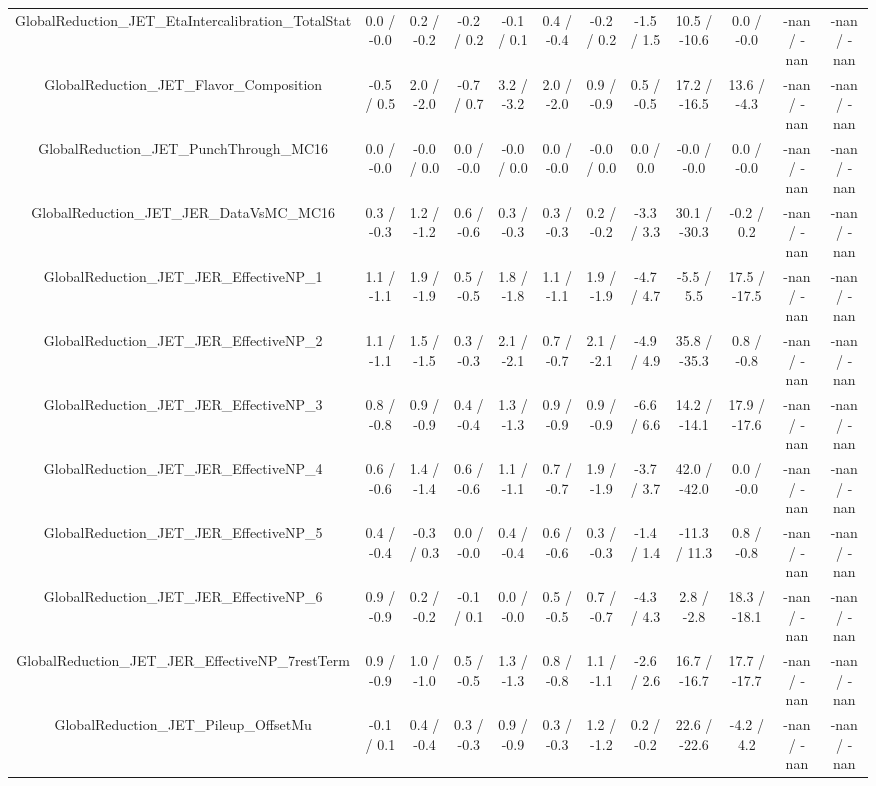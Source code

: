 \begin{table}[htbp]
\begin{center}
\begin{tabular}{|c|c|c|c|c|c|c|c|c|c|c|c|}
  GlobalReduction_JET_EtaIntercalibration_TotalStat & 0.0 / -0.0 & 0.2 / -0.2 & -0.2 / 0.2 & -0.1 / 0.1 & 0.4 / -0.4 & -0.2 / 0.2 & -1.5 / 1.5 & 10.5 / -10.6 & 0.0 / -0.0 & -nan / -nan & -nan / -nan \\ 
  GlobalReduction_JET_Flavor_Composition & -0.5 / 0.5 & 2.0 / -2.0 & -0.7 / 0.7 & 3.2 / -3.2 & 2.0 / -2.0 & 0.9 / -0.9 & 0.5 / -0.5 & 17.2 / -16.5 & 13.6 / -4.3 & -nan / -nan & -nan / -nan \\ 
  GlobalReduction_JET_PunchThrough_MC16 & 0.0 / -0.0 & -0.0 / 0.0 & 0.0 / -0.0 & -0.0 / 0.0 & 0.0 / -0.0 & -0.0 / 0.0 & 0.0 / 0.0 & -0.0 / -0.0 & 0.0 / -0.0 & -nan / -nan & -nan / -nan \\ 
  GlobalReduction_JET_JER_DataVsMC_MC16 & 0.3 / -0.3 & 1.2 / -1.2 & 0.6 / -0.6 & 0.3 / -0.3 & 0.3 / -0.3 & 0.2 / -0.2 & -3.3 / 3.3 & 30.1 / -30.3 & -0.2 / 0.2 & -nan / -nan & -nan / -nan \\ 
  GlobalReduction_JET_JER_EffectiveNP_1 & 1.1 / -1.1 & 1.9 / -1.9 & 0.5 / -0.5 & 1.8 / -1.8 & 1.1 / -1.1 & 1.9 / -1.9 & -4.7 / 4.7 & -5.5 / 5.5 & 17.5 / -17.5 & -nan / -nan & -nan / -nan \\ 
  GlobalReduction_JET_JER_EffectiveNP_2 & 1.1 / -1.1 & 1.5 / -1.5 & 0.3 / -0.3 & 2.1 / -2.1 & 0.7 / -0.7 & 2.1 / -2.1 & -4.9 / 4.9 & 35.8 / -35.3 & 0.8 / -0.8 & -nan / -nan & -nan / -nan \\ 
  GlobalReduction_JET_JER_EffectiveNP_3 & 0.8 / -0.8 & 0.9 / -0.9 & 0.4 / -0.4 & 1.3 / -1.3 & 0.9 / -0.9 & 0.9 / -0.9 & -6.6 / 6.6 & 14.2 / -14.1 & 17.9 / -17.6 & -nan / -nan & -nan / -nan \\ 
  GlobalReduction_JET_JER_EffectiveNP_4 & 0.6 / -0.6 & 1.4 / -1.4 & 0.6 / -0.6 & 1.1 / -1.1 & 0.7 / -0.7 & 1.9 / -1.9 & -3.7 / 3.7 & 42.0 / -42.0 & 0.0 / -0.0 & -nan / -nan & -nan / -nan \\ 
  GlobalReduction_JET_JER_EffectiveNP_5 & 0.4 / -0.4 & -0.3 / 0.3 & 0.0 / -0.0 & 0.4 / -0.4 & 0.6 / -0.6 & 0.3 / -0.3 & -1.4 / 1.4 & -11.3 / 11.3 & 0.8 / -0.8 & -nan / -nan & -nan / -nan \\ 
  GlobalReduction_JET_JER_EffectiveNP_6 & 0.9 / -0.9 & 0.2 / -0.2 & -0.1 / 0.1 & 0.0 / -0.0 & 0.5 / -0.5 & 0.7 / -0.7 & -4.3 / 4.3 & 2.8 / -2.8 & 18.3 / -18.1 & -nan / -nan & -nan / -nan \\ 
  GlobalReduction_JET_JER_EffectiveNP_7restTerm & 0.9 / -0.9 & 1.0 / -1.0 & 0.5 / -0.5 & 1.3 / -1.3 & 0.8 / -0.8 & 1.1 / -1.1 & -2.6 / 2.6 & 16.7 / -16.7 & 17.7 / -17.7 & -nan / -nan & -nan / -nan \\ 
  GlobalReduction_JET_Pileup_OffsetMu & -0.1 / 0.1 & 0.4 / -0.4 & 0.3 / -0.3 & 0.9 / -0.9 & 0.3 / -0.3 & 1.2 / -1.2 & 0.2 / -0.2 & 22.6 / -22.6 & -4.2 / 4.2 & -nan / -nan & -nan / -nan \\ 

\end{tabular}
\end{center}
\end{table}

